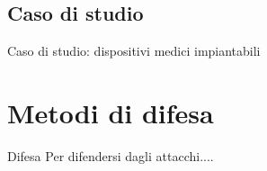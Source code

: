 \documentclass{beamer}
\begin{document}
\subsection{Caso di studio}
\begin{frame}{Caso di studio: dispositivi medici impiantabili}
    
\end{frame}

\section{Metodi di difesa}
\begin{frame}{Difesa}
Per difendersi dagli attacchi....
    
\end{frame}
\end{document}
